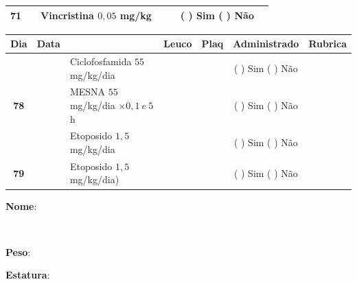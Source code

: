 \documentclass[11pt,a4paper,oldfontcommands]{memoir}
\def\entrywithlabel[#1]#2{\parbox{#1}{{\small #2:} \hrulefill}}
\begin{document}
\begin{center}
\begin{table}[H]
\begin{tabular}{p{1cm}c|p{4.8cm}|p{1.8cm}p{1.8cm}|c|c}
    \hline
    \multicolumn{1}{c|}{\textbf{71}}&&{Vincristina \(0,05\) mg/kg}&\multicolumn{1}{c}{}&&{(  ) Sim (  ) Não}&\\
    \hline
\end{tabular}
\end{table}
\begin{table}[H] \small
\begin{tabular}{p{1cm}c|p{4.8cm}|p{1.8cm}p{1.8cm}|c|c}
	\hline
	\multicolumn{1}{c|}{\multirow{1}{*}{\textbf{Dia}}}&{Data}&{}&\multicolumn{1}{c|}{Leuco}&\multicolumn{1}{c|}{Plaq}&{Administrado}&{Rubrica} \\
    \hline
    \multicolumn{1}{c|}{\multirow{3}{*}{\textbf{78}}}&&{Ciclofosfamida \(55\) mg/kg/dia}&\multicolumn{1}{c|}{}&&{(  ) Sim (  ) Não}&\\
    \cline{4-5}
    \multicolumn{1}{c|}{}&&{MESNA \(55\) mg/kg/dia \(\times 0,1 \:e\: 5\)h}&&&{(  ) Sim (  ) Não}&\\
    \multicolumn{1}{c|}{}&&{Etoposido \(1,5\) mg/kg/dia}&&&{(  ) Sim (  ) Não}&\\
    \hline
    \multicolumn{1}{c|}{\multirow{1}{*}{\textbf{79}}}&&{Etoposido \(1,5\) mg/kg/dia)}&{}&&{(  ) Sim (  ) Não}&\\
    \hline
\end{tabular}
\end{table}
\pagebreak
    \noindent
\entrywithlabel[1\hsize]{\textbf{Nome}}\hfill
\\[0.3cm]
\entrywithlabel[.45\hsize]{\textbf{Peso}}\hfill  \entrywithlabel[.45\hsize]{\textbf{Estatura}}


\end{center}
\end{document}

